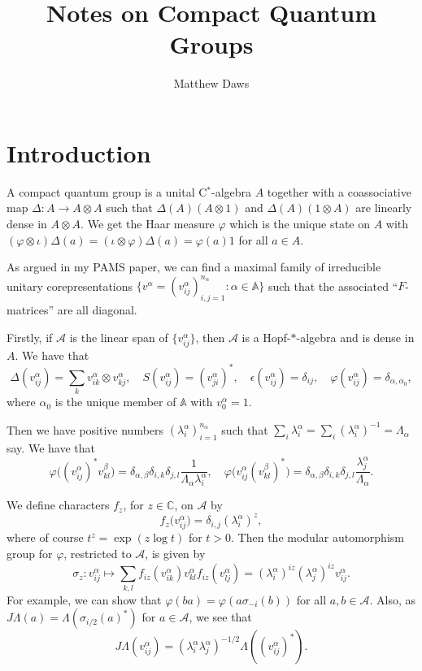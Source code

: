 \documentclass[twoside,a4paper,12pt]{article}
\theoremstyle{plain}
\theoremstyle{definition}
\newcommand{\mc}{\mathcal}
\begin{document}
\title{Notes on Compact Quantum Groups}
\author{Matthew Daws}

\section{Introduction}

A compact quantum group is a unital C$^*$-algebra $A$ together with a
coassociative map $\Delta:A\rightarrow A\otimes A$ such that
$\Delta(A)(A\otimes 1)$ and $\Delta(A)(1\otimes A)$ are linearly dense in
$A\otimes A$.  We get the Haar measure $\varphi$ which is the unique state
on $A$ with $(\varphi\otimes\iota)\Delta(a) = (\iota\otimes\varphi)\Delta(a)
= \varphi(a) 1$ for all $a\in A$.

As argued in my PAMS paper, we can find a maximal family of irreducible
unitary corepresentations $\{ v^\alpha = (v^\alpha_{ij})_{i,j=1}^{n_\alpha}
: \alpha\in\mathbb A\}$ such that the associated ``$F$-matrices'' are all
diagonal.

Firstly, if $\mc A$ is the linear span of $\{ v^\alpha_{ij} \}$, then $\mc A$
is a Hopf-$*$-algebra and is dense in $A$.  We have that
\[ \Delta(v^\alpha_{ij}) = \sum_k v^\alpha_{ik} \otimes v^\alpha_{kj},
\quad S(v^\alpha_{ij}) = (v^\alpha_{ji})^*, \quad
\epsilon(v^\alpha_{ij}) = \delta_{ij}, \quad
\varphi(v^\alpha_{ij}) = \delta_{\alpha,\alpha_0}, \]
where $\alpha_0$ is the unique member of $\mathbb A$ with $v^\alpha_0 = 1$.

Then we have positive numbers $(\lambda^\alpha_i)_{i=1}^{n_\alpha}$ such that
$\sum_i \lambda^\alpha_i = \sum_i (\lambda^\alpha_i)^{-1} = \Lambda_\alpha$ say.
We have that
\[ \varphi\big( (v^\alpha_{ij})^* v^\beta_{kl} \big)
= \delta_{\alpha,\beta} \delta_{i,k} \delta_{j,l}
\frac{1}{\Lambda_\alpha \lambda^\alpha_i}, \quad
\varphi\big( v^\alpha_{ij} (v^\beta_{kl})^* \big)
= \delta_{\alpha,\beta} \delta_{i,k} \delta_{j,l}
\frac{\lambda^\alpha_j}{\Lambda_\alpha}. \]

We define characters $f_z$, for $z\in\mathbb C$, on $\mc A$ by
\[ f_z\big( v^\alpha_{ij} \big) = \delta_{i,j} (\lambda^\alpha_i)^z, \]
where of course $t^z = \exp(z\log t)$ for $t>0$.  Then the modular automorphism
group for $\varphi$, restricted to $\mc A$, is given by
\[ \sigma_z: v^\alpha_{ij} \mapsto \sum_{k,l} f_{iz}(v^\alpha_{ik}) v^\alpha_{kl}
f_{iz}(v^\alpha_{lj})
= (\lambda^\alpha_i)^{iz} (\lambda^\alpha_j)^{iz} v^\alpha_{ij}. \]
For example, we can show that $\varphi(ba) = \varphi(a\sigma_{-i}(b))$ for
all $a,b\in\mc A$.  Also, as $J\Lambda(a) = \Lambda(\sigma_{i/2}(a)^*)$ for
$a\in\mc A$, we see that
\[ J\Lambda(v^\alpha_{ij}) = (\lambda^\alpha_i \lambda^\alpha_j)^{-1/2}
\Lambda((v^\alpha_{ij})^*). \]
\end{document}
